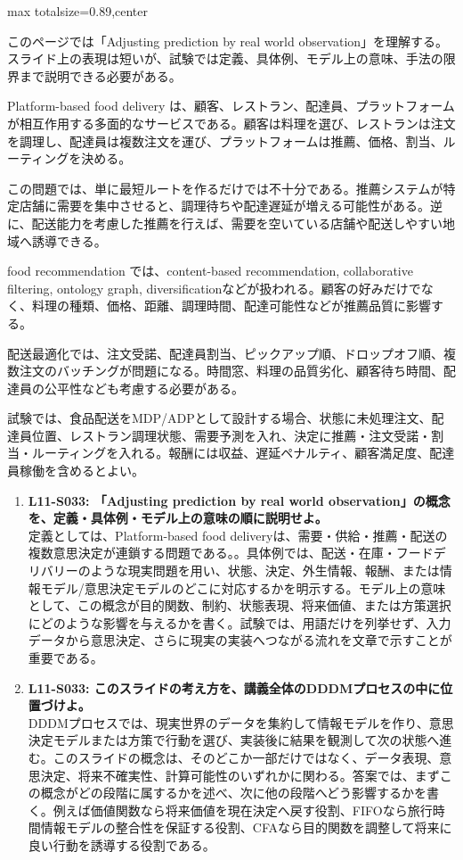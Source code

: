 \begin{minipage}[t]{0.58\textwidth}
\begin{adjustbox}{max totalsize={\textwidth}{0.89\textheight},center}
\begin{minipage}{\textwidth}\scriptsize
{}このページでは「Adjusting prediction by real world observation」を理解する。スライド上の表現は短いが、試験では定義、具体例、モデル上の意味、手法の限界まで説明できる必要がある。\par
Platform-based food delivery は、顧客、レストラン、配達員、プラットフォームが相互作用する多面的なサービスである。顧客は料理を選び、レストランは注文を調理し、配達員は複数注文を運び、プラットフォームは推薦、価格、割当、ルーティングを決める。\par
この問題では、単に最短ルートを作るだけでは不十分である。推薦システムが特定店舗に需要を集中させると、調理待ちや配達遅延が増える可能性がある。逆に、配送能力を考慮した推薦を行えば、需要を空いている店舗や配送しやすい地域へ誘導できる。\par
food recommendation では、content-based recommendation, collaborative filtering, ontology graph, diversificationなどが扱われる。顧客の好みだけでなく、料理の種類、価格、距離、調理時間、配達可能性などが推薦品質に影響する。\par
配送最適化では、注文受諾、配達員割当、ピックアップ順、ドロップオフ順、複数注文のバッチングが問題になる。時間窓、料理の品質劣化、顧客待ち時間、配達員の公平性なども考慮する必要がある。\par
試験では、食品配送をMDP/ADPとして設計する場合、状態に未処理注文、配達員位置、レストラン調理状態、需要予測を入れ、決定に推薦・注文受諾・割当・ルーティングを入れる。報酬には収益、遅延ペナルティ、顧客満足度、配達員稼働を含めるとよい。\par{}\begin{enumerate}\item \textbf{L11-S033: 「Adjusting prediction by real world observation」の概念を、定義・具体例・モデル上の意味の順に説明せよ。}\\定義としては、Platform-based food deliveryは、需要・供給・推薦・配送の複数意思決定が連鎖する問題である。。具体例では、配送・在庫・フードデリバリーのような現実問題を用い、状態、決定、外生情報、報酬、または情報モデル/意思決定モデルのどこに対応するかを明示する。モデル上の意味として、この概念が目的関数、制約、状態表現、将来価値、または方策選択にどのような影響を与えるかを書く。試験では、用語だけを列挙せず、入力データから意思決定、さらに現実の実装へつながる流れを文章で示すことが重要である。\item \textbf{L11-S033: このスライドの考え方を、講義全体のDDDMプロセスの中に位置づけよ。}\\DDDMプロセスでは、現実世界のデータを集約して情報モデルを作り、意思決定モデルまたは方策で行動を選び、実装後に結果を観測して次の状態へ進む。このスライドの概念は、そのどこか一部だけではなく、データ表現、意思決定、将来不確実性、計算可能性のいずれかに関わる。答案では、まずこの概念がどの段階に属するかを述べ、次に他の段階へどう影響するかを書く。例えば価値関数なら将来価値を現在決定へ戻す役割、FIFOなら旅行時間情報モデルの整合性を保証する役割、CFAなら目的関数を調整して将来に良い行動を誘導する役割である。\end{enumerate}

\end{minipage}
\end{adjustbox}
\end{minipage}

